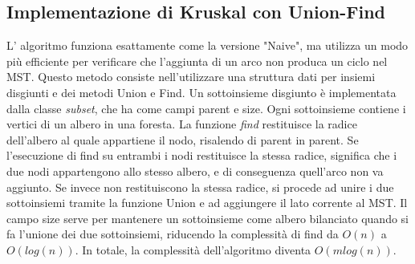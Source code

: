 \subsection{Implementazione di Kruskal con Union-Find}
L' algoritmo funziona esattamente come la versione "Naive", ma utilizza un modo più efficiente per verificare
che l'aggiunta di un arco non produca un ciclo nel MST. Questo metodo consiste nell'utilizzare una struttura dati per insiemi disgiunti e dei metodi Union e Find. Un sottoinsieme disgiunto è implementata dalla classe \textit{subset}, che
ha come campi parent e size. Ogni sottoinsieme contiene i vertici di un albero in una foresta. La funzione \textit{find} restituisce la radice dell'albero al quale appartiene il nodo, risalendo di parent in parent. Se l'esecuzione di find su entrambi i nodi restituisce la stessa radice,
significa che i due nodi appartengono  allo stesso albero, e di conseguenza quell'arco non va aggiunto. Se invece non restituiscono la stessa radice, si procede ad unire i due sottoinsiemi tramite la funzione Union
e ad aggiungere il lato corrente al MST. Il campo size serve per mantenere un sottoinsieme come albero bilanciato quando si fa l'unione dei due sottoinsiemi, riducendo la complessità di find da $O(n)$ a $O(log(n))$. In totale, la complessità dell'algoritmo diventa $O(m log(n))$.